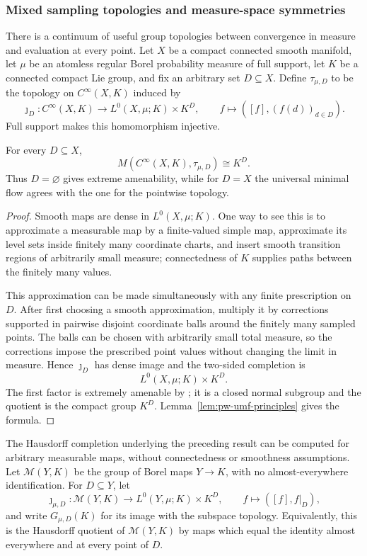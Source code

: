 \subsubsection{Mixed sampling topologies and measure-space symmetries}

There is a continuum of useful group topologies between convergence in measure
and evaluation at every point. Let \(X\) be a compact connected smooth
manifold, let \(\mu\) be an atomless regular Borel probability measure of full
support, let \(K\) be a connected compact Lie group, and fix an arbitrary set
\(D\subseteq X\). Define \(\tau_{\mu,D}\) to be the topology on
\(C^\infty(X,K)\) induced by
\[
\jmath_D:C^\infty(X,K)\longrightarrow
 L^0(X,\mu;K)\times K^D,
 \qquad f\longmapsto([f],(f(d))_{d\in D}).
\]
Full support makes this homomorphism injective.

\begin{theorem}\label{thm:pw-mixed-sampling-umf}
For every \(D\subseteq X\),
\[
M(C^\infty(X,K),\tau_{\mu,D})\cong K^D.
\]
Thus \(D=\varnothing\) gives extreme amenability, while for \(D=X\) the
universal minimal flow agrees with the one for the pointwise topology.
\end{theorem}

\begin{proof}
Smooth maps are dense in \(L^0(X,\mu;K)\). One way to see this is to
approximate a measurable map by a finite-valued simple map, approximate its
level sets inside finitely many coordinate charts, and insert smooth transition
regions of arbitrarily small measure; connectedness of \(K\) supplies paths
between the finitely many values.

This approximation can be made simultaneously with any finite prescription on
\(D\). After first choosing a smooth approximation, multiply it by corrections
supported in pairwise disjoint coordinate balls around the finitely many sampled
points. The balls can be chosen with arbitrarily small total measure, so the
corrections impose the prescribed point values without changing the limit in
measure. Hence \(\jmath_D\) has dense image and the two-sided completion is
\[
L^0(X,\mu;K)\times K^D.
\]
The first factor is extremely amenable by \cite[Theorem~1.1]{PestovSchneider2017}; it is a
closed normal subgroup and the quotient is the compact group \(K^D\).
Lemma~\ref{lem:pw-umf-principles} gives the formula.
\end{proof}

The Hausdorff completion underlying the preceding result can be computed for
arbitrary measurable maps, without connectedness or smoothness assumptions.
Let \(\mathcal M(Y,K)\) be the group of Borel maps \(Y\to K\), with no
almost-everywhere identification. For \(D\subseteq Y\), let
\[
 \jmath_{\mu,D}:\mathcal M(Y,K)\longrightarrow
 L^0(Y,\mu;K)\times K^D,
 \qquad f\longmapsto([f],f|_D),
\]
and write \(G_{\mu,D}(K)\) for its image with the subspace topology.
Equivalently, this is the Hausdorff quotient of \(\mathcal M(Y,K)\) by maps
which equal the identity almost everywhere and at every point of \(D\).


